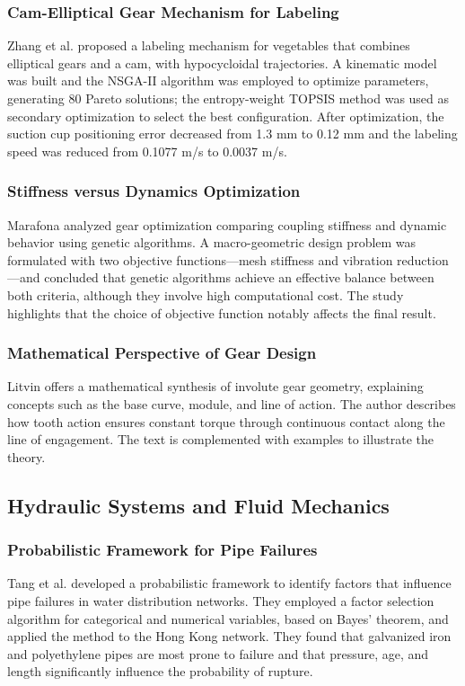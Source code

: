 \documentclass{article}
\begin{document}
\subsubsection*{Cam-Elliptical Gear Mechanism for Labeling}
Zhang et al. \cite{zhang2024cam} proposed a labeling mechanism for vegetables that combines elliptical gears and a cam, with hypocycloidal trajectories.
A kinematic model was built and the NSGA-II algorithm was employed to optimize parameters, generating 80 Pareto solutions; the entropy-weight TOPSIS method was used as secondary optimization to select the best configuration.
After optimization, the suction cup positioning error decreased from 1.3 mm to 0.12 mm and the labeling speed was reduced from 0.1077 m/s to 0.0037 m/s.

\subsubsection*{Stiffness versus Dynamics Optimization}
Marafona \cite{marafona2024stiffness} analyzed gear optimization comparing coupling stiffness and dynamic behavior using genetic algorithms.
A macro-geometric design problem was formulated with two objective functions—mesh stiffness and vibration reduction—and concluded that genetic algorithms achieve an effective balance between both criteria, although they involve high computational cost.
The study highlights that the choice of objective function notably affects the final result.

\subsubsection*{Mathematical Perspective of Gear Design}
Litvin \cite{litvin1995applied} offers a mathematical synthesis of involute gear geometry, explaining concepts such as the base curve, module, and line of action.
The author describes how tooth action ensures constant torque through continuous contact along the line of engagement.
The text is complemented with examples to illustrate the theory.

\subsection*{Hydraulic Systems and Fluid Mechanics}

\subsubsection*{Probabilistic Framework for Pipe Failures}
Tang et al. \cite{tang2024probabilistic} developed a probabilistic framework to identify factors that influence pipe failures in water distribution networks.
They employed a factor selection algorithm for categorical and numerical variables, based on Bayes' theorem, and applied the method to the Hong Kong network.
They found that galvanized iron and polyethylene pipes are most prone to failure and that pressure, age, and length significantly influence the probability of rupture.
\end{document}
